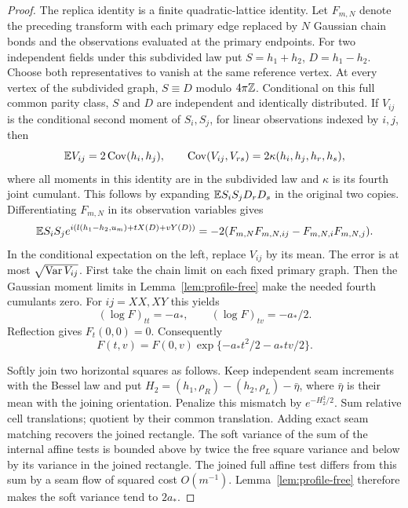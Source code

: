 \begin{proof}
The replica identity is a finite quadratic-lattice identity. Let
$F_{m,N}$ denote the preceding transform with each primary edge
replaced by $N$ Gaussian chain bonds and the observations evaluated
at the primary endpoints. For two independent fields under this
subdivided law put $S=h_1+h_2$, $D=h_1-h_2$.
Choose both representatives to vanish at the same reference vertex.
At every vertex of the subdivided graph, $S\equiv D$ modulo
$4\pi\mathbb Z$. Conditional on this full common parity class, $S$ and $D$
are independent and identically distributed. If $V_{ij}$ is the conditional second moment
of $S_i,S_j$, for linear observations indexed by $i,j$, then
\begin{equation}\label{eq:profile-replica}
 \mathbb E V_{ij}=2\operatorname{Cov}(h_i,h_j),\qquad
 \operatorname{Cov}(V_{ij},V_{rs})=2\kappa(h_i,h_j,h_r,h_s),
\end{equation}
where all moments in this identity are in the subdivided law and
$\kappa$ is its fourth joint cumulant. This follows by expanding
$\mathbb E S_iS_jD_rD_s$ in the original two copies. Differentiating
$F_{m,N}$ in its observation variables gives
\[
 \mathbb E S_iS_j e^{i(l(h_1-h_2,u_m)+tX(D)+vY(D))}
       =-2(F_{m,N}F_{m,N,ij}-F_{m,N,i}F_{m,N,j}).
\]
In the conditional expectation on the left, replace $V_{ij}$ by its
mean. The error is at most $\sqrt{\operatorname{Var} V_{ij}}$. First take the chain
limit on each fixed primary graph. Then the Gaussian moment limits
in Lemma~\ref{lem:profile-free} make the needed fourth cumulants zero.
For $ij=XX,XY$ this yields
\[
 (\log F)_{tt}=-a_*,\qquad (\log F)_{tv}=-a_*/2.
\]
Reflection gives $F_t(0,0)=0$. Consequently
\begin{equation}\label{eq:profile-phase-transform}
 F(t,v)=F(0,v)\exp\{-a_*t^2/2-a_*tv/2\}.
\end{equation}

Softly join two horizontal squares as follows. Keep independent
seam increments with the Bessel law and put
$H_2=(h_1,\rho_R)-(h_2,\rho_L)-\bar\eta$,
where $\bar\eta$ is their mean with the joining orientation.
Penalize this mismatch by $e^{-H_2^2/2}$. Sum relative cell translations; quotient by their
common translation. Adding exact seam matching recovers the joined
rectangle. The soft variance of the sum of the internal affine tests
is bounded above by twice the free square variance and below by its
variance in the joined rectangle. The joined full affine test differs
from this sum by a seam flow of squared cost $O(m^{-1})$.
Lemma~\ref{lem:profile-free} therefore makes the soft variance tend to
$2a_*$.


\end{proof}
